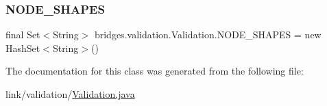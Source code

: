 \subsubsection{\texorpdfstring{N\+O\+D\+E\+\_\+\+S\+H\+A\+P\+ES}{NODE\_SHAPES}}
{\footnotesize\ttfamily final Set$<$String$>$ bridges.\+validation.\+Validation.\+N\+O\+D\+E\+\_\+\+S\+H\+A\+P\+ES = new Hash\+Set$<$String$>$()\hspace{0.3cm}{\ttfamily [static]}}



The documentation for this class was generated from the following file\+:\begin{DoxyCompactItemize}
\item 
link/validation/\hyperlink{_validation_8java}{Validation.\+java}\end{DoxyCompactItemize}

